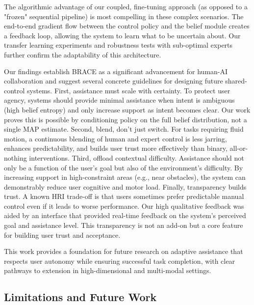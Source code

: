 \documentclass[11pt]{article}
\begin{document}
The algorithmic advantage of our coupled, fine-tuning approach (as opposed to a "frozen" sequential pipeline) is most compelling in these complex scenarios. The end-to-end gradient flow between the control policy and the belief module creates a feedback loop, allowing the system to learn what to be uncertain about. Our transfer learning experiments and robustness tests with sub-optimal experts further confirm the adaptability of this architecture.


Our findings establish BRACE as a significant advancement for human-AI collaboration and suggest several concrete guidelines for designing future shared-control systems. First, assistance must scale with certainty. To protect user agency, systems should provide minimal assistance when intent is ambiguous (high belief entropy) and only increase support as intent becomes clear. Our work proves this is possible by conditioning policy on the full belief distribution, not a single MAP estimate. Second, blend, don't just switch. For tasks requiring fluid motion, a continuous blending of human and expert control is less jarring, enhances predictability, and builds user trust more effectively than binary, all-or-nothing interventions. Third, offload contextual difficulty. Assistance should not only be a function of the user's goal but also of the environment's difficulty. By increasing support in high-constraint areas (e.g., near obstacles), the system can demonstrably reduce user cognitive and motor load. Finally, transparency builds trust. A known HRI trade-off is that users sometimes prefer predictable manual control even if it leads to worse performance. Our high qualitative feedback was aided by an interface that provided real-time feedback on the system's perceived goal and assistance level. This transparency is not an add-on but a core feature for building user trust and acceptance.

This work provides a foundation for future research on adaptive assistance that respects user autonomy while ensuring successful task completion, with clear pathways to extension in high-dimensional and multi-modal settings.

\subsection{Limitations and Future Work}
\end{document}
